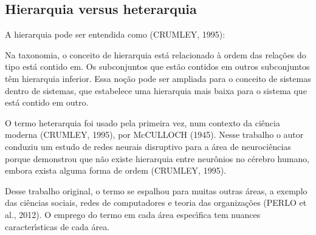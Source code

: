 \documentclass[
12pt,		%
openright,	%
twoside,  %
a4paper,			%
chapter=TITLE,		%
english,			%
french,				%
spanish,			%
brazil				%
]{USPSC-classe/USPSC}
\begin{document}
\subsection[Hierarquia versus heterarquia]{Hierarquia versus heterarquia}\label{Hierarquia versus heterarquia}
A hierarquia pode ser entendida como (CRUMLEY, 1995):











\noindent\begin{center}\mbox{\centering{}}\end{center}


Na taxonomia, o conceito de hierarquia est\'a relacionado \`a ordem das rela\c{c}\~oes do tipo \textquotedbl est\'a contido em\textquotedbl . Os subconjuntos que est\~ao contidos em outros subconjuntos t\^em hierarquia inferior. Essa no\c{c}\~ao pode ser ampliada para o conceito de \textquotedbl sistemas dentro de sistemas\textquotedbl , que estabelece uma hierarquia mais baixa para o sistema que est\'a contido em outro.










O termo heterarquia foi usado pela primeira vez, num contexto da ci\^encia moderna  (CRUMLEY, 1995), por  McCULLOCH (1945).  Nesse trabalho o autor conduziu um estudo de redes neurais disruptivo para a \'area de neuroci\^encias porque demonstrou que n\~ao existe hierarquia entre neur\^onios no c\'erebro humano, embora exista alguma forma de ordem  (CRUMLEY, 1995).










Desse trabalho original, o termo se espalhou para muitas outras \'areas, a exemplo das ci\^encias sociais, redes de computadores e teoria das organiza\c{c}\~oes  (PERLO et al., 2012). O emprego do termo em cada \'area espec\'{\i}fica tem nuances caracter\'{\i}sticas de cada \'area.
\end{document}
